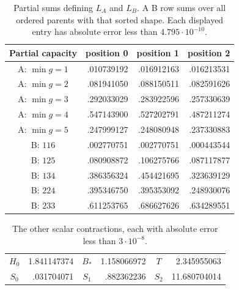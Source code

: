 \begin{table}[htbp]
\centering
\small
\begin{tabular}{c r r r}
\hline
Partial capacity & position 0 & position 1 & position 2\\\hline
A: $\min g=1$ & .010739192 & .016912163 & .016213531\\
A: $\min g=2$ & .081941050 & .088150511 & .082591626\\
A: $\min g=3$ & .292033029 & .283922596 & .257330639\\
A: $\min g=4$ & .547143900 & .527202791 & .487211274\\
A: $\min g=5$ & .247999127 & .248080948 & .237330883\\\hline
B: $116$ & .002770751 & .002770751 & .000443544\\
B: $125$ & .080908872 & .106275766 & .087117877\\
B: $134$ & .386356324 & .454421695 & .323639129\\
B: $224$ & .395346750 & .395353092 & .248930076\\
B: $233$ & .611253765 & .686627626 & .634289551\\\hline
\end{tabular}
\caption{Partial sums defining $L_A$ and $L_B$. A B row sums over all ordered
parents with that sorted shape. Each displayed entry has absolute error less
than $4.795\cdot10^{-10}$.}
\label{tab:capacities}
\end{table}
\begin{table}[htbp]
\centering
\begin{tabular}{c r@{\qquad}c r@{\qquad}c r}
\hline
$H_0$ & 1.841147374 & $B_*$ & 1.158066972 & $T$ & 2.345955063\\
$S_0$ & .031704071 & $S_1$ & .882362236 & $S_2$ & 11.680704014\\\hline
\end{tabular}
\caption{The other scalar contractions, each with absolute error less than
$3\cdot10^{-8}$.}
\label{tab:scalars}
\end{table}

